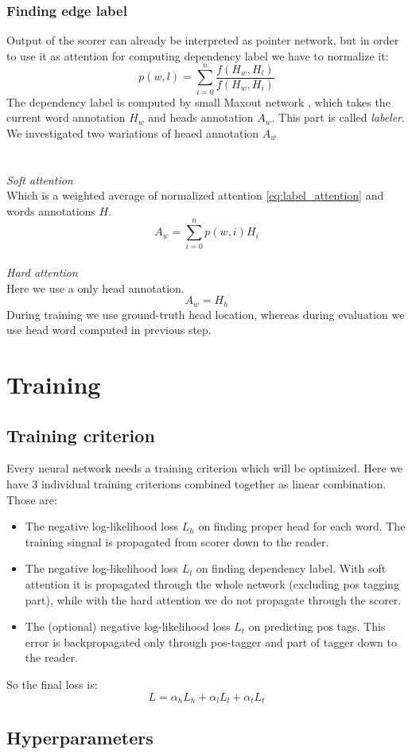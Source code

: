 \subsubsection{Finding edge label}
Output of the scorer can already be interpreted as
pointer network, but in order to use it as attention for computing dependency label
we have to normalize it:
\begin{equation} \label{eq:label_attention}
    p(w,l) = \sum_{i=0}^{n} \frac{f(H_w, H_l)}{f(H_w, H_i)}
\end{equation}
The dependency label is computed by small Maxout network \cite{goodfellow_maxout_2013},
which takes the current word annotation $H_w$ and heads annotation $A_w$. This
part is called \textit{labeler}.
We investigated two wariations of heaed annotation $A_w$
\\
\\
\\
\textit{Soft attention}\\
Which is a weighted average of normalized attention \ref{eq:label_attention}
and words annotations $H$. 
$$ A_w = \sum_{i=0}^{n} p(w,i)H_i $$
\\
\textit{Hard attention}\\
Here we use a only head annotation.
$$ A_w = H_h $$
During training we use ground-truth head location, whereas during evaluation
we use head word computed in previous step.

\section{Training}
\subsection{Training criterion}
Every neural network needs a training criterion which will be optimized.
Here we have 3 individual training criterions combined together as linear
combination. Those are:
\begin{itemize}
        \item The negative log-likelihood loss $L_h$ on finding proper head for each
            word. The training singnal is propagated from scorer down to the reader.
        \item The negative log-likelihood loss $L_l$ on finding dependency label.
            With soft attention it is propagated through the whole network (excluding
            pos tagging part), while with the hard attention we do not propagate
            through the scorer.
        \item The (optional) negative log-likelihood loss $L_t$ on predicting pos tags.
            This error is backpropagated only through pos-tagger and part of tagger
            down to the reader.
\end{itemize}
So the final loss is:
\begin{equation}\label{eq:neural_loss}
    L = \alpha_hL_h + \alpha_lL_l + \alpha_tL_t
\end{equation}

\subsection{Hyperparameters}
